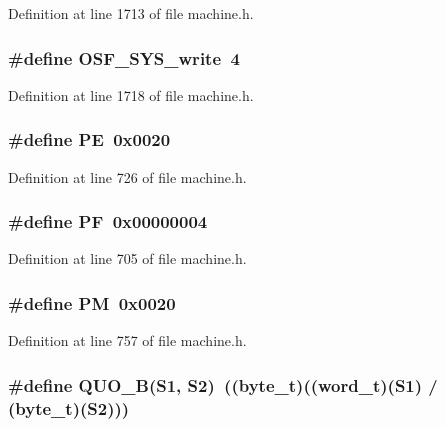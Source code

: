 Definition at line 1713 of file machine.h.
\subsubsection[{OSF\_\-SYS\_\-write}]{\setlength{\rightskip}{0pt plus 5cm}\#define OSF\_\-SYS\_\-write~4}\label{machine_8h_b3490dcba9d82cc588450bddbb60de79}




Definition at line 1718 of file machine.h.
\subsubsection[{PE}]{\setlength{\rightskip}{0pt plus 5cm}\#define PE~0x0020}\label{machine_8h_211238ffe3627f42ca7b04bc96cc8fa6}




Definition at line 726 of file machine.h.
\subsubsection[{PF}]{\setlength{\rightskip}{0pt plus 5cm}\#define PF~0x00000004}\label{machine_8h_a0e278c26c25558741febfadd7216caa}




Definition at line 705 of file machine.h.
\subsubsection[{PM}]{\setlength{\rightskip}{0pt plus 5cm}\#define PM~0x0020}\label{machine_8h_23c7d58108d99a089ce0824823e6b950}




Definition at line 757 of file machine.h.
\subsubsection[{QUO\_\-B}]{\setlength{\rightskip}{0pt plus 5cm}\#define QUO\_\-B(S1, \/  S2)~(({\bf byte\_\-t})(({\bf word\_\-t})(S1) / ({\bf byte\_\-t})(S2)))}\label{machine_8h_deedeebb64d17221e38a86f10995dc33}




